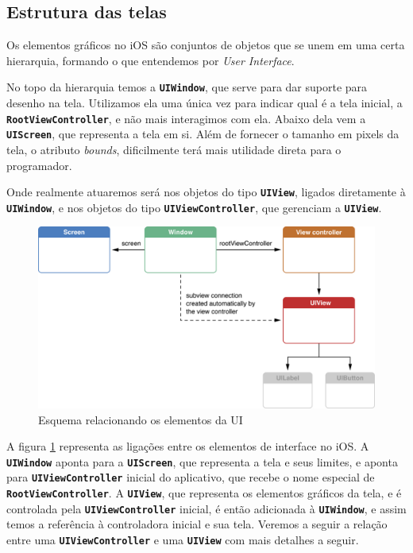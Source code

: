 \documentclass[a4paper,12pt,brazil,doubleside]{book}
\begin{document}
\begin{singlespace}
\section{Estrutura das telas}


Os elementos gráficos no iOS são conjuntos de objetos que se unem em uma certa hierarquia, formando o que entendemos por \emph{User Interface}.

No topo da hierarquia temos a \texttt{\textbf{UIWindow}}, que serve para dar suporte para desenho na tela. Utilizamos ela uma única vez para indicar qual é a tela inicial, a \texttt{\textbf{RootViewController}}, e não mais interagimos com ela. Abaixo dela vem a \texttt{\textbf{UIScreen}}, que representa a tela em si. Além de fornecer o tamanho em pixels da tela, o atributo \emph{bounds}, dificilmente terá mais utilidade direta para o programador.

Onde realmente atuaremos será nos objetos do tipo \texttt{\textbf{UIView}}, ligados diretamente à \texttt{\textbf{UIWindow}}, e nos objetos do tipo \texttt{\textbf{UIViewController}}, que gerenciam a \texttt{\textbf{UIView}}.

\begin{figure}[H]
  \centering
  \includegraphics[width=.75\textwidth]{figuras/apple_window_view_controller_screen.png}
  \caption{Esquema relacionando os elementos da UI}
  \label{fig:relacionamento_UI}
\end{figure}

A figura \ref{fig:relacionamento_UI} representa as ligações entre os elementos de interface no iOS. A \texttt{\textbf{UIWindow}} aponta para a \texttt{\textbf{UIScreen}}, que representa a tela e seus limites, e aponta para  \texttt{\textbf{UIViewController}} inicial do aplicativo, que recebe o nome especial de \texttt{\textbf{RootViewController}}. A \texttt{\textbf{UIView}}, que representa os elementos gráficos da tela, e é controlada pela \texttt{\textbf{UIViewController}} inicial, é então adicionada à \texttt{\textbf{UIWindow}}, e assim temos a referência à controladora inicial e sua tela. Veremos a seguir a relação entre uma \texttt{\textbf{UIViewController}} e uma \texttt{\textbf{UIView}} com mais detalhes a seguir.


\end{singlespace}
\end{document}
